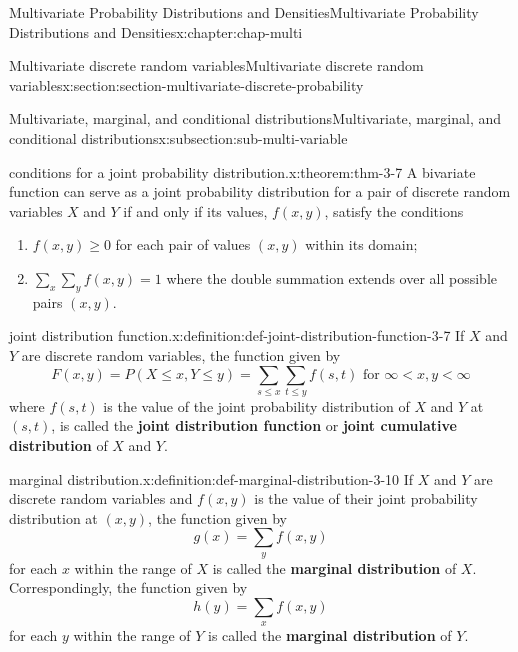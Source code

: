 \documentclass[oneside,10pt,]{book}
\newcommand{\terminology}[1]{\textbf{#1}}
\numberwithin{equation}{section}
\newcommand{\lt}{<}
\begin{document}
\begin{chapterptx}{Multivariate Probability Distributions and Densities}{}{Multivariate Probability Distributions and Densities}{}{}{x:chapter:chap-multi}
\begin{sectionptx}{Multivariate discrete random variables}{}{Multivariate discrete random variables}{}{}{x:section:section-multivariate-discrete-probability}
\begin{subsectionptx}{Multivariate, marginal, and conditional distributions}{}{Multivariate, marginal, and conditional distributions}{}{}{x:subsection:sub-multi-variable}
\begin{theorem}{conditions for a joint probability distribution.}{}{x:theorem:thm-3-7}%
A bivariate function can serve as a joint probability distribution for a pair of discrete random variables \(\displaystyle X\) and \(\displaystyle Y\) if and only if its values, \(\displaystyle f(x,
y)\), satisfy the conditions%
\begin{enumerate}
\item{}\(\displaystyle f(x, y) \ge 0\) for each pair of values \(\displaystyle (x, y)\) within its domain;%
\item{}\(\displaystyle \sum_x\sum_y f(x, y) = 1\) where the double summation extends over all possible pairs \(\displaystyle (x,
y)\).%
\end{enumerate}
%
\end{theorem}
\begin{definition}{joint distribution function.}{x:definition:def-joint-distribution-function-3-7}%
If \(\displaystyle X\) and \(\displaystyle Y\) are discrete random variables, the function given by%
\begin{equation*}
F(x, y) = P(X \le x, Y \le y) =
\sum_{s\le x} \sum_{t\le y} f(s, t) \text{ for } \infty \lt x, y \lt
\infty
\end{equation*}
where \(\displaystyle f(s, t)\) is the value of the joint probability distribution of \(\displaystyle X\) and \(\displaystyle
Y\) at \(\displaystyle (s, t)\), is called the \terminology{joint distribution function} or \terminology{joint cumulative distribution} of \(\displaystyle X\) and \(\displaystyle
Y\).%
\end{definition}
\begin{definition}{marginal distribution.}{x:definition:def-marginal-distribution-3-10}%
If \(\displaystyle X\) and \(\displaystyle Y\) are discrete random variables and \(\displaystyle f(x, y)\) is the value of their joint probability distribution at \(\displaystyle (x, y)\), the function given by%
\begin{equation*}
g(x) = \sum_y f(x, y)
\end{equation*}
for each \(\displaystyle x\) within the range of \(\displaystyle X\) is called the \terminology{marginal distribution} of \(\displaystyle X\). Correspondingly, the function given by%
\begin{equation*}
h(y) = \sum_x f(x, y)
\end{equation*}
for each \(\displaystyle y\) within the range of \(\displaystyle Y\) is called the \terminology{marginal distribution} of \(\displaystyle Y\).%

\end{definition}
\end{subsectionptx}
\end{sectionptx}
\end{chapterptx}
\end{document}

